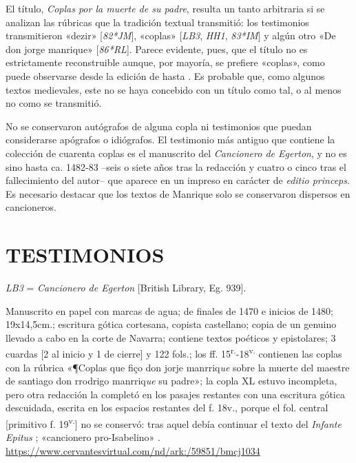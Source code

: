 \documentclass[11pt,a4paper,twoside]{article}
\newcommand{\comillas}[1]{«#1»}
\newcommand{\tsup}[1]{\textsuperscript{#1}}
\begin{document}
El título, \textit{Coplas por la muerte de su padre}, resulta un tanto arbitraria si se analizan las rúbricas que la tradición textual transmitió: los testimonios transmitieron \comillas{dezir} [\textit{82*JM}], \comillas{coplas} [\textit{LB3}, \textit{HH1}, \textit{83*IM}] y algún otro \comillas{De don jorge manrique} [\textit{86*RL}]. Parece evidente, pues, que el título no es estrictamente reconstruible aunque, por mayoría, se prefiere \comillas{coplas}, como puede observarse desde la edición de \textcite{Foulché-Delbosc1902} hasta \textcite{Beltrán2013}. Es probable que, como algunos textos medievales, este no se haya concebido con un título como tal, o al menos no como se transmitió.

No se conservaron autógrafos de alguna copla ni testimonios que puedan considerarse apógrafos o idiógrafos. El testimonio más antiguo que contiene la colección de cuarenta coplas es el manuscrito del \textit{Cancionero de Egerton}, y no es sino hasta ca. 1482-83 --seis o siete años tras la redacción y cuatro o cinco tras el fallecimiento del autor-- que aparece en un impreso en carácter de \textit{editio princeps}. Es necesario destacar que los textos de Manrique solo se conservaron dispersos en cancioneros.

\section*{\fontsize{13}{14.35}\selectfont TESTIMONIOS}

\textit{LB3} = \textit{Cancionero de Egerton} [British Library, Eg. 939].

Manuscrito en papel con marcas de agua; de finales de 1470 e inicios de 1480; 19x14,5cm.; escritura gótica cortesana, copista castellano; copia de un genuino llevado a cabo en la corte de Navarra; contiene textos poéticos y epistolares; 3 cuardas [2 al inicio y 1 de cierre] y 122 fols.; los ff. 15\tsup{r.}-18\tsup{v.} contienen las coplas con la rúbrica \comillas{¶Coplas que fiço don jorje manrriq\textit{ue} sobre la muerte del maestre de santiago don rrodrigo manrriq\textit{ue} su padre}; la copla XL estuvo incompleta, pero otra redacción la completó en los pasajes restantes con una escritura gótica descuidada, escrita en los espacios restantes del f. 18v., porque el fol. central [primitivo f. 19\tsup{v.}] no se conservó: tras aquel debía continuar el texto del \textit{Infante Epitus} \textcite{Beltrán2011}; \comillas{cancionero pro-Isabelino} \parencite{Severin2000}. \url{https://www.cervantesvirtual.com/nd/ark:/59851/bmcj1034}\vspace{5pt}
\end{document}
